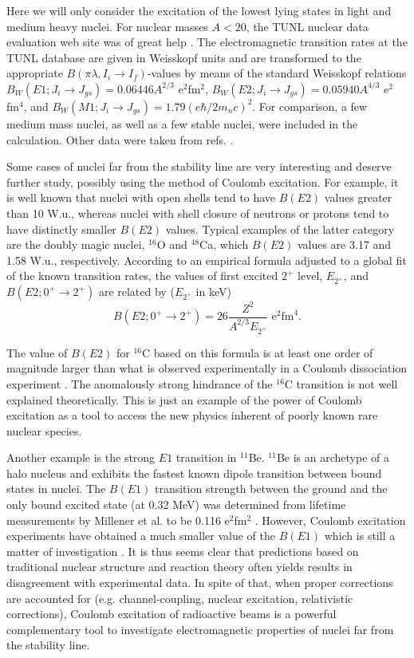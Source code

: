 \documentclass[prc,preprint,showpacs,showkeys,nofootinbib]{revtex4}%
\begin{document}
Here we will only consider the excitation of the lowest lying states
in light and medium heavy nuclei. For nuclear masses $A<20$, the
TUNL nuclear data evaluation web site was of great help \cite{tunl}.
The electromagnetic transition rates at the TUNL database are given
in Weisskopf units and are transformed to the appropriate
$B(\pi\lambda,I_{i}\rightarrow I_{f})$-values by means of the
standard Weisskopf relations $B_W(E1;J_{i}\rightarrow
J_{gs})=0.06446A^{2/3}$
e$^{2}$fm$^{2}$, $B_W(E2;J_{i}\rightarrow J_{gs})=0.05940A^{4/3}$ e$^{2}$%
fm$^{4}$, and $B_W(M1;J_{i}\rightarrow J_{gs})=1.79\left(  e\hbar/2m_{n}%
c\right)  ^{2}$. For comparison, a few medium mass nuclei, as well
as a few stable nuclei, were included in the calculation. Other data
were taken from refs. \cite{Mot95,Sch96,Gad03,Im04}.

Some cases of nuclei far from the stability line are very
interesting and deserve further study, possibly using the method of
Coulomb excitation. For example, it is well known that nuclei with
open shells tend to have $B(E2)$ values greater than 10 W.u.,
whereas nuclei with shell closure of neutrons or protons tend to
have distinctly smaller $B(E2)$ values. Typical examples of the
latter category are the doubly magic nuclei, $^{16}$O and $^{48}$Ca,
which $B(E2)$ values are 3.17 and 1.58 W.u., respectively. According
to an empirical formula adjusted to a global fit of the known
transition rates, the
values of first excited $2^{+}$ level, $E_{2^{+}}$, and $B(E2;0^{+}%
\rightarrow2^{+})$ are related by \cite{Ra88} ($E_{2^+}$ in keV)
\begin{equation}
B(E2;0^{+}\rightarrow2^{+})=26\frac{Z^{2}}{A^{2/3}E_{2^{+}}}\text{ e}%
^{2}\text{fm}^{4}.
\end{equation}


The value of $B(E2)$ for $^{16}$C based on this formula is at least
one order of magnitude larger than what is observed experimentally
in a Coulomb dissociation experiment \cite{Im04}. The anomalously
strong hindrance of the $^{16}$C transition is not well explained
theoretically. This is just an example of the power of Coulomb
excitation as a tool to access the new physics inherent of poorly
known rare nuclear species.

Another example is the strong $E1$ transition in $^{11}$Be.
$^{11}$Be is an archetype of a halo nucleus and exhibits the fastest
known dipole transition between bound states in nuclei. The $B(E1)$
transition strength between the ground and the only bound excited
state (at 0.32 MeV) was determined from lifetime measurements by
Millener et al. to be 0.116 e$^{2}$fm$^{2}$ \cite{Mi83}. However,
Coulomb excitation experiments have obtained a much smaller value of
the $B(E1)$ which is still a matter of investigation
\cite{BCH95,Hus06,Cha07}. It is thus seems clear that predictions based on
traditional nuclear structure and reaction theory often yields
results in disagreement with experimental data. In spite of that,
when proper corrections are accounted for (e.g. channel-coupling,
nuclear excitation, relativistic corrections), Coulomb excitation of
radioactive beams is a powerful complementary tool to investigate
electromagnetic properties of nuclei far from the stability line.
\end{document}
